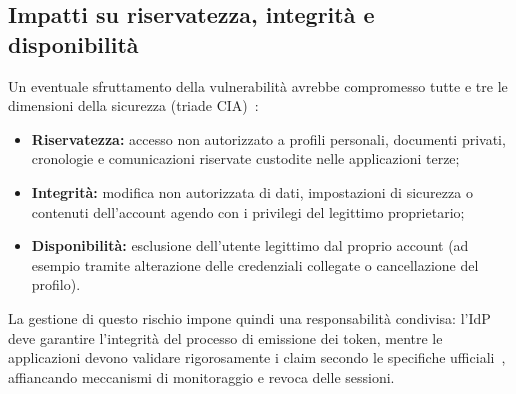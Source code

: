 \subsection{Impatti su riservatezza, integrità e disponibilità}
Un eventuale sfruttamento della vulnerabilità avrebbe compromesso tutte e tre le dimensioni della sicurezza (triade CIA)~\cite{nist800-30}:
\begin{itemize}
    \item \textbf{Riservatezza:} accesso non autorizzato a profili personali, documenti privati, cronologie e comunicazioni riservate custodite nelle applicazioni terze;
    \item \textbf{Integrità:} modifica non autorizzata di dati, impostazioni di sicurezza o contenuti dell'account agendo con i privilegi del legittimo proprietario;
    \item \textbf{Disponibilità:} esclusione dell'utente legittimo dal proprio account (ad esempio tramite alterazione delle credenziali collegate o cancellazione del profilo).
\end{itemize}
La gestione di questo rischio impone quindi una responsabilità condivisa: l'IdP deve garantire l'integrità del processo di emissione dei token, mentre le applicazioni devono validare rigorosamente i claim secondo le specifiche ufficiali~\cite{apple-verifying-user}, affiancando meccanismi di monitoraggio e revoca delle sessioni.
